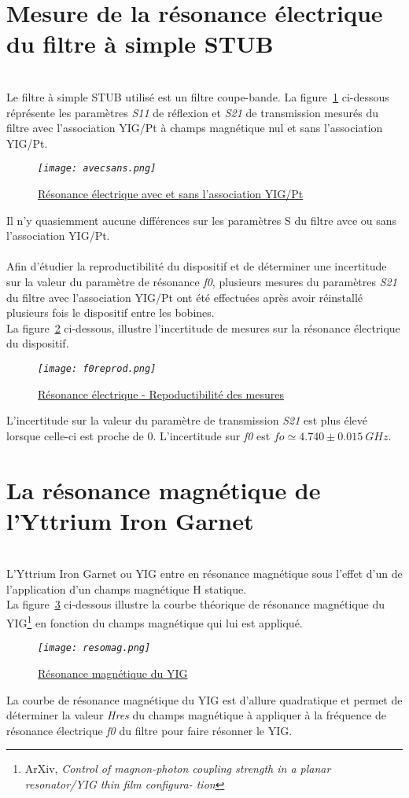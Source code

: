 \documentclass[12pt,fleqn]{book} %
\begin{document}
\section{Mesure de la résonance électrique du filtre à simple STUB}
~\\\noindent Le filtre à simple STUB utilisé est un filtre coupe-bande. La figure~\underline{\color{blue}\ref{fo}} ci-dessous réprésente les paramètres \emph{S11} de réflexion et \emph{S21} de transmission mesurés du filtre avec l'association YIG/Pt à champs magnétique nul et sans l'association YIG/Pt.
\begin{figure}[H]
	\centering
	\itshape
	\texttt{[image: avecsans.png]}
	\caption{\label{fo} \underline{Résonance électrique avec et sans l'association YIG/Pt}}
\end{figure}
\noindent Il n'y quasiemment aucune différences sur les paramètres S du filtre avce ou sans l'association YIG/Pt.
~\\\\Afin d'étudier la reproductibilité du dispositif et de déterminer une incertitude sur la valeur du paramètre de résonance \emph{f0}, plusieurs mesures du paramètres \emph{S21} du filtre avec l'association YIG/Pt ont été effectuées après avoir réinstallé plusieurs fois le dispositif entre les bobines. 
~\\La figure~\underline{\color{blue}\ref{foreprod}} ci-dessous, illustre l'incertitude de mesures sur la résonance électrique du dispositif.
\begin{figure}[H]
	\centering
	\itshape
	\texttt{[image: f0reprod.png]}
	\caption{\label{foreprod} \underline{Résonance électrique - Repoductibilité des mesures}}
\end{figure}
\noindent L'incertitude sur la valeur du paramètre de transmission \emph{\emph{S21}} est plus élevé lorsque celle-ci est proche de 0. L'incertitude sur \emph{f0} est $ fo\simeq4.740\pm0.015\ GHz$.
\section{La résonance magnétique de l'Yttrium Iron Garnet}
~\\\noindent L'Yttrium Iron Garnet ou YIG entre en résonance magnétique sous l'effet d'un de l'application d'un champs magnétique H statique. 
~\\La figure~\underline{\color{blue}\ref{resomag}} ci-dessous illustre la courbe théorique de résonance magnétique du YIG\footnote{ArXiv, \emph{Control of magnon-photon coupling strength in a planar resonator/YIG thin film configura-
tion}} en fonction du champs magnétique qui lui est appliqué.
\begin{figure}[H]
	\centering
	\itshape
	\texttt{[image: resomag.png]}
	\caption{\label{resomag} \underline{Résonance magnétique du YIG}}
\end{figure}
\noindent La courbe de résonance magnétique du YIG est d'allure quadratique et permet de déterminer la valeur \emph{Hres} du champs magnétique à appliquer à la fréquence de résonance électrique \emph{f0} du filtre pour faire résonner le YIG. 
\end{document}

